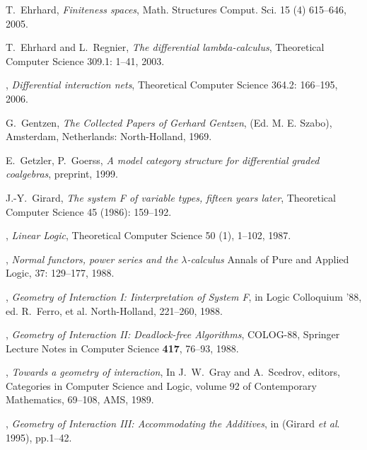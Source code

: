 \documentclass[english,letter paper,12pt,reqno]{article}
\theoremstyle{example}
\numberwithin{equation}{section}
\begin{document}
\begin{thebibliography}{BHLS03}

T.~Ehrhard, \textsl{Finiteness spaces}, Math. Structures Comput. Sci. 15 (4) 615--646, 2005.


T.~Ehrhard and L.~Regnier, \textsl{The differential lambda-calculus}, Theoretical Computer Science 309.1: 1--41, 2003.

\bysame, \textsl{Differential interaction nets}, Theoretical Computer Science 364.2: 166--195, 2006.

G.~Gentzen, \textsl{The Collected Papers of Gerhard Gentzen}, (Ed. M. E. Szabo), Amsterdam, Netherlands: North-Holland, 1969.

E.~Getzler, P.~Goerss, \emph{A model category structure for differential graded coalgebras}, preprint, 1999.
  
J.-Y.~Girard, \textsl{The system F of variable types, fifteen years later}, Theoretical Computer Science 45 (1986): 159--192.
  
\bysame, \textsl{Linear Logic}, Theoretical Computer Science 50 (1), 1--102, 1987.

\bysame, \textsl{Normal functors, power series and the $\lambda$-calculus} Annals of Pure and Applied
Logic, 37: 129--177, 1988.

\bysame, \textsl{Geometry of {I}nteraction I: {I}interpretation of {S}ystem {F}}, in Logic Colloquium '88, ed. R.~Ferro, et al. North-Holland, 221--260, 1988.

\bysame, \textsl{Geometry of {I}nteraction II: {D}eadlock-free {A}lgorithms}, COLOG-88, Springer Lecture Notes in Computer Science \textbf{417}, 76--93, 1988.

\bysame, \textsl{Towards a geometry of interaction}, In J.~W.~Gray and A.~Scedrov, editors, Categories in Computer Science and Logic, volume 92 of Contemporary Mathematics, 69--108, AMS, 1989.

\bysame, \textsl{Geometry of {I}nteraction III: {A}ccommodating the {A}dditives}, in (Girard \textsl{et al}. 1995), pp.1--42.


\end{thebibliography}
\end{document}
